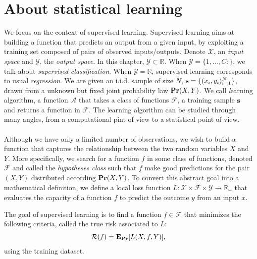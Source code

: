 
\section{About statistical learning}
\label{sec:about_statistical_learning}
We focus on the context of supervised learning. Supervised learning aims at building a function that predicts an output from a given input, by exploiting a training set composed of pairs of observed inputs/outputs. Denote $\mathcal{X}$, an {\it input space} and $\mathcal{Y}$, the {\it output space}. In this chapter, $\mathcal{Y} \subset \mathbb{R}$. When $\mathcal{Y}=\{1, \ldots, C:\}$, we talk about {\it supervised classification}. When $\mathcal{Y}=\mathbb{R}$, supervised learning  corresponds to  usual {\it regression}. We are given an i.i.d. sample of size $N$, $\boldsymbol{\mathbf{s}}=\{(x_i,
y_i)_{i=1}^N\}$, drawn from a unknown but fixed joint probability law ${\mathbf{{Pr}}}(X,Y)$. We call {\emph learning algorithm}, a function $\mathcal{A}$ that takes a class of functions
$\mathcal{F}$, a training sample $\boldsymbol{\mathbf{s}}$ and returns a function in $\mathcal{F}$. The learning algorithm can be studied through many angles, from a computational pint of view to a statistical point of view.
\paragraph{}
Although we have only a limited number of observations, we wish to build a function that captures the relationship between the two random variables $X$ and $Y$. More specifically, we search for a function $f$ in some class of functions, denoted $\mathcal{F}$ and called the {\it hypotheses class} such that $f$ make good predictions for the pair $(X,Y)$ distributed according ${\mathbf{{Pr}}}(X,Y)$. To convert this abstract goal into a mathematical definition, we define a local
loss function $L:\mathcal{X}\times\mathcal{F}\times\mathcal{Y} \to
\mathbb{R}_+$ that evaluates the capacity of a function $f$ to predict the
outcome $y$ from an input $x$.

The goal of supervised learning is to find a function $f \in \mathcal{F}$ that minimizes the following criteria, called the true risk associated to $L$:
\begin{equation}\label{eq:true-risk}
\mathcal{R}(f)={\mathbf{{E}}}_{{\mathbf{{Pr}}}}[L(X,f,Y)],
\end{equation}
using the training dataset.

